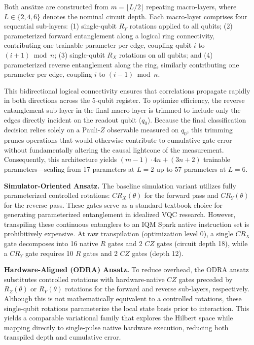 \documentclass[11pt]{article}
\begin{document}
Both ansätze are constructed from $m = \lfloor L/2 \rfloor$ repeating macro-layers, where $L \in \{2, 4, 6\}$ denotes the nominal circuit depth. Each macro-layer comprises four sequential sub-layers: 
(1) single-qubit $R_Y$ rotations applied to all qubits; 
(2) parameterized forward entanglement along a logical ring connectivity, contributing one trainable parameter per edge, coupling qubit $i$ to $(i+1) \bmod n$; 
(3) single-qubit $R_X$ rotations on all qubits; and 
(4) parameterized reverse entanglement along the ring, similarly contributing one parameter per edge, coupling $i$ to $(i-1) \bmod n$. 

This bidirectional logical connectivity ensures that correlations propagate rapidly in both directions across the 5-qubit register. To optimize efficiency, the reverse entanglement sub-layer in the final macro-layer is trimmed to include only the edges directly incident on the readout qubit ($q_0$). Because the final classification decision relies solely on a Pauli-$Z$ observable measured on $q_0$, this trimming prunes operations that would otherwise contribute to cumulative gate error without fundamentally altering the causal lightcone of the measurement. Consequently, this architecture yields $(m-1) \cdot 4n + (3n+2)$ trainable parameters—scaling from 17 parameters at $L=2$ up to 57 parameters at $L=6$.

\textbf{Simulator-Oriented Ansatz.} The baseline simulation variant \cite{havlicek2019} utilizes fully parameterized controlled rotations: $CR_X(\theta)$ for the forward pass and $CR_Y(\theta)$ for the reverse pass. These gates serve as a standard textbook choice for generating parameterized entanglement in idealized VQC research. However, transpiling these continuous entanglers to an IQM Spark native instruction set is prohibitively expensive. At raw transpilation (optimization level 0), a single $CR_X$ gate decomposes into 16 native $R$ gates and 2 $CZ$ gates (circuit depth 18), while a $CR_Y$ gate requires 10 $R$ gates and 2 $CZ$ gates (depth 12).

\textbf{Hardware-Aligned (ODRA) Ansatz.}
To reduce overhead, the ODRA ansatz~\cite{abbas2021} substitutes controlled rotations with hardware-native $CZ$ gates preceded by $R_Z(\theta)$ or $R_Y(\theta)$ rotations for the forward and reverse sub-layers, respectively. Although this is not mathematically equivalent to a controlled rotations, these single-qubit rotations parameterize the local state basis prior to interaction. This yields a comparable variational family that explores the Hilbert space while mapping directly to single-pulse native hardware execution, reducing both transpiled depth and cumulative error.
\end{document}
